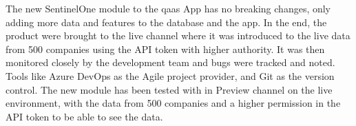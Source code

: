 The new SentinelOne module to the \acrshort{qaas} App has no breaking changes, only adding more data and features to the database and the app.
In the end, the product were brought to the live channel where it was introduced to the live data from 500 companies using the API token with
higher authority. It was then monitored closely by the development team and bugs were tracked and noted. Tools like Azure DevOps as the
Agile project provider, and Git as the version control. The new module has been tested with in Preview channel on the live environment,
with the data from 500 companies and a higher permission in the API token to be able to see the data.




